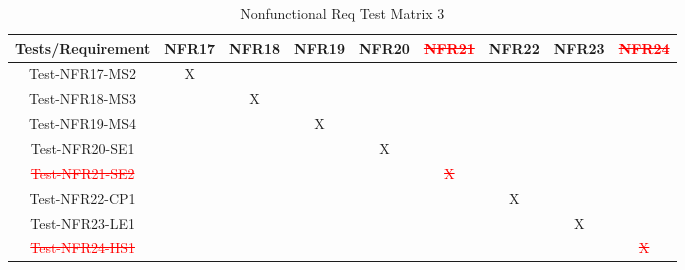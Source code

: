 \documentclass[12pt, titlepage]{article}
\begin{document}
\begin{table}[htp]
\centering
\caption{Nonfunctional Req Test Matrix 3}
\begin{tabular}{|c|c|c|c|c|c|c|c|c|}
\hline
Tests/Requirement & NFR17 & NFR18 & NFR19 & NFR20 & \textcolor{red}{\st{NFR21}}  & NFR22 & NFR23 & \textcolor{red}{\st{NFR24}}\\  \hline
Test-NFR17-MS2    & X     &       &       &       &       &       &       &       \\  \hline
Test-NFR18-MS3    &       & X     &       &       &       &       &       &       \\  \hline
Test-NFR19-MS4    &       &       & X     &       &       &       &       &       \\  \hline
Test-NFR20-SE1    &       &       &       & X     &       &       &       &       \\  \hline
\textcolor{red}{\st{Test-NFR21-SE2}}    &       &       &       &       &\textcolor{red}{\st{X}}     &       &       &       \\  \hline
Test-NFR22-CP1    &       &       &       &       &       & X     &       &       \\  \hline
Test-NFR23-LE1    &       &       &       &       &       &       & X     &       \\ \hline
\textcolor{red}{\st{Test-NFR24-HS1}}    &       &       &       &       &       &       &       & \textcolor{red}{\st{X}}    \\ \hline
\end{tabular}
\end{table}
\newpage
\end{document}
